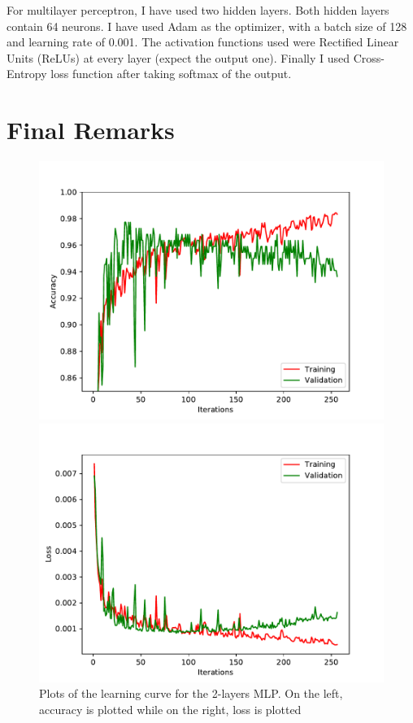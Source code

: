 \documentclass[12pt]{article}
\begin{document}
For multilayer perceptron, I have used two hidden layers.
Both hidden layers contain 64 neurons.
I have used Adam \cite{kingma2014adam} as the optimizer, with a batch size of 128 and learning rate of 0.001.
The activation functions used were Rectified Linear Units (ReLUs) \cite{dahl2013improving} at every layer (expect the output one).
Finally I used Cross-Entropy loss function after taking softmax of the output.

\section{Final Remarks}

\begin{figure}[]
	\centering
	\begin{minipage}{0.5\textwidth}
		\centering
		\includegraphics[width=1.1\textwidth]{Accuracy-Learning-Curve.pdf} %
	\end{minipage}\hfill
	\begin{minipage}{0.5\textwidth}
		\centering
		\includegraphics[width=1.1\textwidth]{Loss-Learning-Curve.pdf} %
	\end{minipage}
	\caption{Plots of the learning curve for the 2-layers MLP. On the left, accuracy is plotted while on the right, loss is plotted}
\end{figure}
\end{document}
